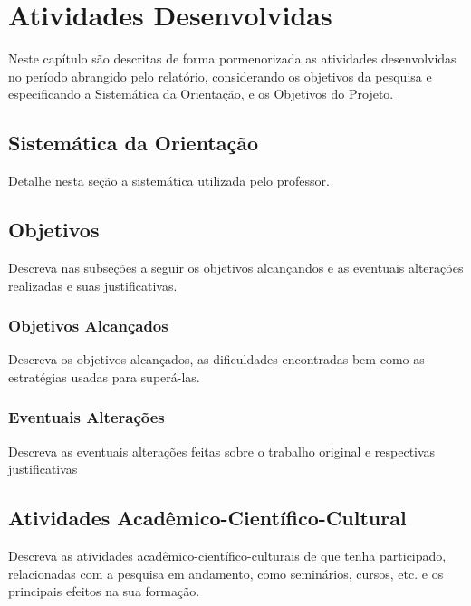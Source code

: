 \chapter{Atividades Desenvolvidas}

Neste capítulo são descritas de forma pormenorizada as atividades desenvolvidas no período abrangido pelo relatório, considerando os objetivos da pesquisa e especificando a Sistemática da Orientação, e os Objetivos do Projeto.

\section{Sistemática da Orientação}

Detalhe nesta seção a sistemática utilizada pelo professor.

\section{Objetivos}

Descreva nas subseções a seguir os objetivos alcançandos e as eventuais alterações realizadas e suas justificativas.

\subsection{Objetivos Alcançados}

Descreva os  objetivos  alcançados,  as  dificuldades  encontradas bem  como  as estratégias  usadas para superá-las.

\subsection{Eventuais Alterações}

Descreva as eventuais alterações feitas sobre o trabalho original e respectivas justificativas

\section{Atividades Acadêmico-Científico-Cultural}

Descreva as atividades acadêmico-científico-culturais de que tenha participado, relacionadas com a pesquisa  em  andamento,  como  seminários,  cursos,  etc.  e  os principais  efeitos  na  sua formação.

